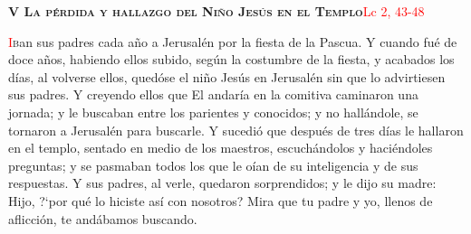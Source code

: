 \noindent\textbf{\textsc{V La pérdida y hallazgo del Niño Jesús en el Templo}}\hfill\textcolor{red}{Lc 2, 43-48}

\vspace{0.25em}

\lettrine[lines=2]{\textcolor{red}{I}}ban sus padres cada año a Jerusalén por la fiesta de la Pascua. Y cuando fué de doce años, habiendo ellos subido, según la costumbre de la fiesta,
y acabados los días, al volverse ellos, quedóse el niño Jesús en Jerusalén sin que lo advirtiesen sus padres. Y creyendo ellos que El andaría en la comitiva caminaron una jornada; y le
buscaban entre los parientes y conocidos; y no hallándole, se tornaron a Jerusalén para buscarle. Y sucedió que después de tres días le hallaron en el templo,
sentado en medio de los maestros, escuchándolos y haciéndoles preguntas; y se pasmaban todos los que le oían de su inteligencia y de sus respuestas.
Y sus padres, al verle, quedaron sorprendidos; y le dijo su madre: Hijo, {?`}por qué lo hiciste así con nosotros? Mira que tu padre y yo, llenos de aflicción, 
te andábamos buscando.